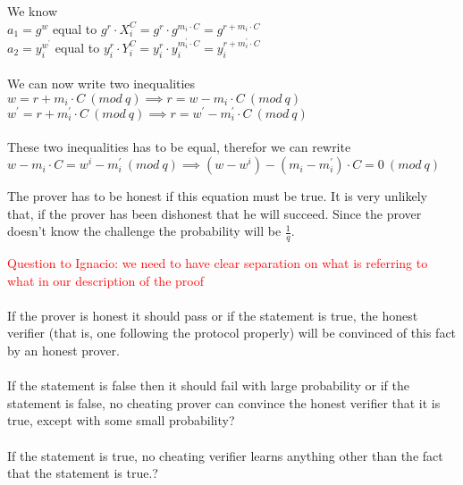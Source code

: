 \begin{infobox}
We know\\
\begin{math} a_1= g^w \end{math} equal to \begin{math}g^r  \cdot  X_i^C=g^r \cdot g^{m_i \cdot C} = g^{r+m_i \cdot C}\end{math}\\
\begin{math} a_2= y_i^{w^{'}}\end{math} equal to \begin{math}y_i^r  \cdot  Y_i^C=y_i^r \cdot y_i^{m_i^{'} \cdot C} = y_i^{r+m_i^{'} \cdot C}\end{math}\\\\
We can now write two inequalities\\
\begin{math} w= r+m_i  \cdot  C\ (mod\ q) \implies r= w-m_i \cdot C\ (mod\ q) \end{math}\\
\begin{math} w^{'}= r+m_i^{'}  \cdot  C\ (mod\ q) \implies r= w^{'}-m_i^{'}  \cdot  C\ (mod\ q) \end{math}\\\\
These two inequalities has to be equal, therefor we can rewrite\\
\begin{math}w-m_i \cdot C = w^i-m_i^{'}\ (mod\ q) \implies (w-w^i)-(m_i - m_i^{'})  \cdot  C = 0 \ (mod\ q) \end{math}
\end{infobox}


\noindent
The prover has to be honest if this equation must be true. It is very unlikely that, if the prover has been dishonest that he will succeed. Since the prover doesn't know the challenge the probability will be \begin{math} \frac{1}{q}\end{math}.


\begin{infobox}
\textcolor{red}{Question to Ignacio: we need to have clear separation on what is referring to what in our description of the proof}\\\\
 If the prover is honest it should pass or if the statement is true, the honest verifier (that is, one following the protocol properly)
will be convinced of this fact by an honest prover.\\\\
If the statement is false then it should fail with large probability or if the statement is false, no cheating prover can convince
the honest verifier that it is true, except with some small probability?\\\\
 If the statement is true, no cheating verifier learns anything other than the fact that the statement is true.?
\end{infobox}

